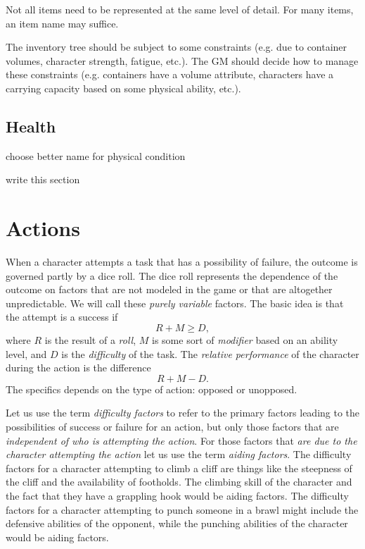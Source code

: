 \documentclass[12pt]{article}
\newcommand{\notes}[1]{{\color{Tan} #1}}
\begin{document}
Not all items need to be represented at the same level of detail.
For many items, an item name may suffice.

The inventory tree should be subject to some constraints
(e.g. due to container volumes, character strength, fatigue, etc.).
The GM should decide how to manage these constraints
(e.g. containers have a volume attribute, characters have a carrying capacity based on some physical ability, etc.).

\subsection{Health} \label{sec:health}

\notes{choose better name for physical condition}

\notes{write this section}


\section{Actions}\label{sec:actions}
When a character attempts a task that has a possibility of failure, the outcome is governed partly by a dice roll.
The dice roll represents the dependence of the outcome on factors that are not modeled in the game or that are altogether unpredictable.
We will call these \emph{purely variable} factors.
The basic idea is that the attempt is a success if
$$ R + M \geq D, $$
where $R$ is the result of a \emph{roll}, $M$ is some sort of \emph{modifier} based on an ability level,
and $D$ is the \emph{difficulty} of the task.
The \emph{relative performance} of the character during the action is the difference
$$ R+M-D. $$
The specifics depends on the type of action: opposed or unopposed.



Let us use the term \emph{difficulty factors} to refer to
the primary factors leading to the possibilities of success or failure for an action,
but only those factors that are \emph{independent of who is attempting the action}.
For those factors that \emph{are due to the character attempting the action} let us use the term \emph{aiding factors}.
The difficulty factors for a character attempting to climb a cliff are things
like the steepness of the cliff and the availability of footholds.
The climbing skill of the character and the fact that they have a grappling hook would be aiding factors.
The difficulty factors for a character attempting to punch someone in a brawl might include the defensive abilities of the opponent,
while the punching abilities of the character would be aiding factors.
\end{document}
